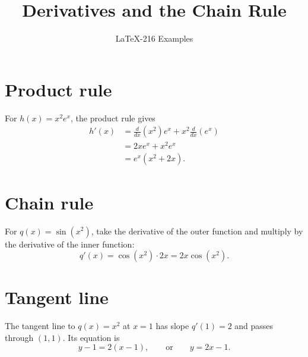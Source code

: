 \documentclass{article}
\title{Derivatives and the Chain Rule}
\author{LaTeX-216 Examples}
\date{}
\begin{document}
\maketitle

\section{Product rule}
For $h(x)=x^2 e^x$, the product rule gives
\begin{align*}
  h'(x)
    &= \frac{d}{dx}(x^2)e^x + x^2\frac{d}{dx}(e^x) \\
    &= 2x e^x + x^2 e^x \\
    &= e^x(x^2+2x).
\end{align*}

\section{Chain rule}
For $q(x)=\sin(x^2)$, take the derivative of the outer function and multiply
by the derivative of the inner function:
\[
  q'(x) = \cos(x^2)\cdot 2x = 2x\cos(x^2).
\]

\section{Tangent line}
The tangent line to $q(x)=x^2$ at $x=1$ has slope $q'(1)=2$ and passes through
$(1,1)$. Its equation is
\[
  y-1=2(x-1), \qquad\text{or}\qquad y=2x-1.
\]
\end{document}
